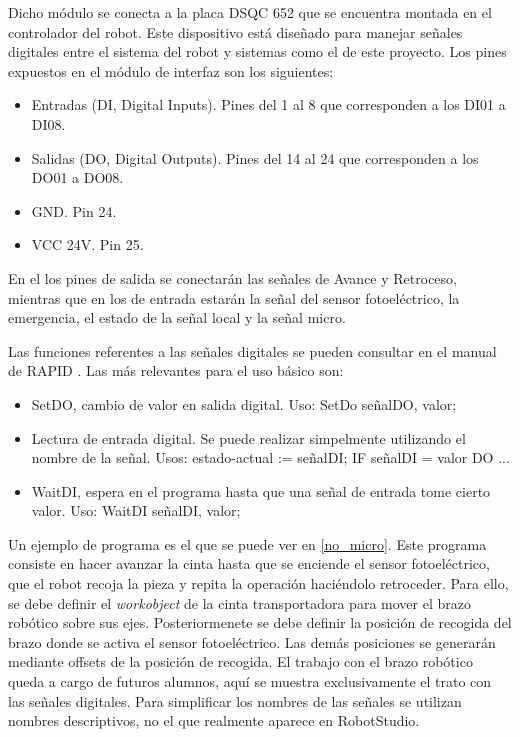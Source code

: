 Dicho módulo se conecta a la placa DSQC 652 que se encuentra montada en el controlador del robot.
Este dispositivo está diseñado para manejar señales digitales entre el sistema del robot y sistemas
como el de este proyecto. Los pines expuestos en el módulo de interfaz son los siguientes:
\begin{itemize}
    \item Entradas (DI, Digital Inputs). Pines del 1 al 8 que corresponden a los DI01 a DI08.
    \item Salidas (DO, Digital Outputs). Pines del 14 al 24 que corresponden a los DO01 a DO08.
    \item GND. Pin 24.
    \item VCC 24V. Pin 25.
\end{itemize}

En el los pines de salida se conectarán las señales de Avance y Retroceso, mientras que en los
de entrada estarán la señal del sensor fotoeléctrico, la emergencia, el estado de la señal local y
la señal micro.

Las funciones referentes a las señales digitales se pueden consultar en el manual de RAPID \cite{rapid}.
Las más relevantes para el uso básico son:
\begin{itemize}
    \item SetDO, cambio de valor en salida digital. Uso: SetDo señalDO, valor;
    \item Lectura de entrada digital. Se puede realizar simpelmente utilizando el nombre de la señal. 
    Usos: estado-actual := señalDI; IF señalDI = valor DO ...
    \item WaitDI, espera en el programa hasta que una señal de entrada tome cierto valor.
    Uso: WaitDI señalDI, valor;
\end{itemize}

Un ejemplo de programa es el que se puede ver en \ref{no_micro}. Este programa consiste en hacer avanzar
la cinta hasta que se enciende el sensor fotoeléctrico, que el robot recoja la pieza y repita la operación
haciéndolo retroceder. Para ello, se debe definir el \textit{workobject} de la cinta transportadora para mover
el brazo robótico sobre sus ejes. Posteriormenete se debe definir la posición de recogida del brazo donde 
se activa el sensor fotoeléctrico. Las demás posiciones se generarán mediante offsets de la posición de recogida.
El trabajo con el brazo robótico queda a cargo de futuros alumnos, aquí se muestra exclusivamente el trato 
con las señales digitales. Para simplificar los nombres de las señales se utilizan nombres descriptivos, no
el que realmente aparece en RobotStudio.

